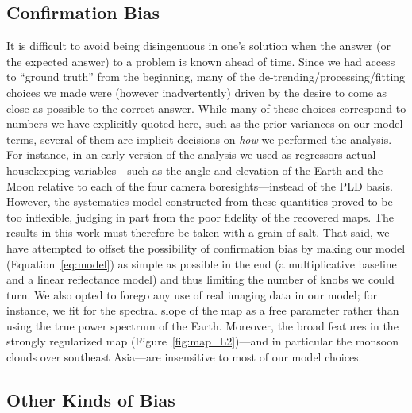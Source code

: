 \documentclass[modern]{aastex62}
\begin{document}
\subsection{Confirmation Bias}
\label{sec:confirmation}

It is difficult to avoid being disingenuous in one's solution
when the answer (or the expected answer)
to a problem is known ahead of time. Since we had access to 
``ground truth'' from the beginning, many of the de-trending/processing/fitting
choices we made were (however inadvertently) driven by the desire to
come as close as possible to the correct answer. While many of these choices
correspond to numbers we have explicitly quoted here, such as the prior
variances on our model terms, several of them are implicit decisions on
\emph{how} we performed the analysis. For instance, in an early version of 
the analysis we used as regressors actual \TESS housekeeping variables---such as the angle 
and elevation of the Earth and the Moon relative to each of the four camera 
boresights---instead of the PLD basis. However, the systematics model constructed from these quantities
proved to be too inflexible, judging in part from the poor fidelity of the recovered
maps. The results in this work
must therefore be taken with a grain of salt. That said, we have attempted to
offset the possibility of confirmation bias by making our model
(Equation~\ref{eq:model}) as simple as possible in the end (a multiplicative baseline
and a linear reflectance model) and thus limiting
the number of knobs we could turn. We also opted to forego any use of 
real imaging data in our model; for instance, we fit for the spectral
slope of the map as a free parameter rather than using the true power spectrum 
of the Earth. Moreover, the broad features in the strongly
regularized map (Figure~\ref{fig:map_L2})---and in particular the monsoon clouds
over southeast Asia---are insensitive to most of our model choices.

\subsection{Other Kinds of Bias}
\label{sec:bias}
\end{document}
